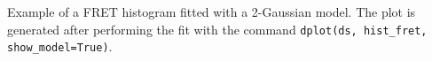 \label{fig:hist_fit} Example of a FRET histogram fitted with a 2-Gaussian model. The plot is generated after performing the fit with the command \texttt{dplot(ds, hist_fret, show_model=True)}.